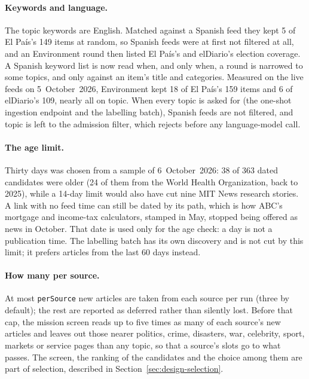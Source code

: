 \paragraph{Keywords and language.} The topic keywords are English.
Matched against a Spanish feed they kept 5 of El País's 149 items at
random, so Spanish feeds were at first not filtered at all, and an
Environment round then listed El País's and elDiario's election
coverage. A Spanish keyword list is now read when, and only when, a
round is narrowed to some topics, and only against an item's title and
categories. Measured on the live feeds on 5~October~2026, Environment
kept 18 of El País's 159 items and 6 of elDiario's 109, nearly all on
topic. When every topic is asked for (the one-shot ingestion endpoint
and the labelling batch), Spanish feeds are not filtered, and topic is
left to the admission filter, which rejects before any language-model
call.

\paragraph{The age limit.} Thirty days was chosen from a sample of
6~October~2026: 38 of 363 dated candidates were older (24 of them from
the World Health Organization, back to 2025), while a 14-day limit
would also have cut nine MIT News research stories. A link with no
feed time can still be dated by its path, which is how ABC's mortgage
and income-tax calculators, stamped in May, stopped being offered as
news in October. That date is used only for the age check: a day is
not a publication time. The labelling batch has its own discovery and
is not cut by this limit; it prefers articles from the last 60 days
instead.

\paragraph{How many per source.} At most \texttt{perSource} new
articles are taken from each source per run (three by default); the
rest are reported as deferred rather than silently lost. Before that
cap, the mission screen reads up to five times as many of each
source's new articles and leaves out those nearer politics, crime,
disasters, war, celebrity, sport, markets or service pages than any
topic, so that a source's slots go to what passes. The screen, the
ranking of the candidates and the choice among them are part of
selection, described in Section~\ref{sec:design-selection}.
